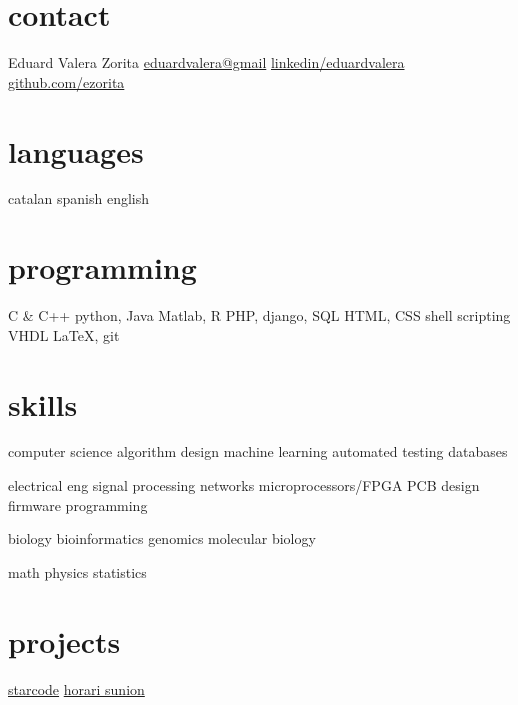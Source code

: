 \documentclass[]{friggeri-cv} %
\begin{document}



\begin{aside} %
  \section{contact}
  {\FA \faUser}
  Eduard Valera Zorita
  {\FA \faEnvelope}
  \href{mailto:eduardvalera@gmail.com}{eduardvalera@gmail}
  {\FA \faLinkedinSign}
  \href{http://www.linkedin.com/in/eduardvalera}{linkedin/eduardvalera}
  {\FA \faGithubSign}
  \href{http://github.com/ezorita}{github.com/ezorita}
  \section{languages}
  catalan
  spanish
  english
  \section{programming}
  C \& C++
  python, Java
  Matlab, R
  PHP, django, SQL
  HTML, CSS
  shell scripting
  VHDL
  \LaTeX, git
  \section{skills}
  computer science
  algorithm design
  machine learning
  automated testing
  databases

  electrical eng
  signal processing
  networks
  microprocessors/FPGA
  PCB design
  firmware programming

  biology
  bioinformatics
  genomics
  molecular biology

  math
  physics
  statistics
  \section{projects}
  \href{http://github.com/gui11aume/starcode}{starcode}
  \href{http://horari.sunion.cat}{horari sunion}
\end{aside}

\end{document}
